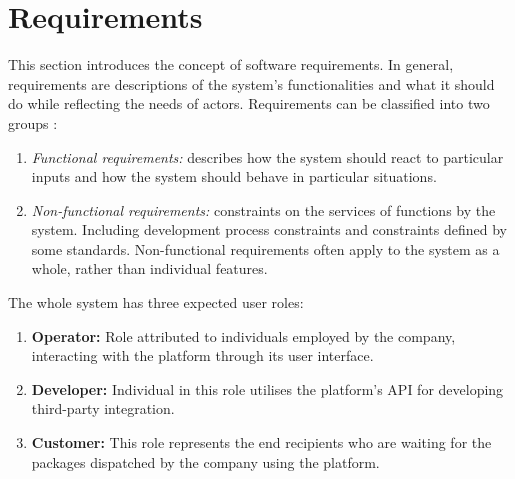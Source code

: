 \section{Requirements}
\label{sec:requirements}
This section introduces the concept of software requirements.
In general, requirements are descriptions of the system's functionalities and what it should do while reflecting the needs of actors.
Requirements can be classified into two groups \cite{sommervilleSW}:
\begin{enumerate}
    \item \textit{Functional requirements:} describes how the system should react to particular inputs and how the system should behave in particular situations.
    \item \textit{Non-functional requirements:} constraints on the services of functions by the system. Including development process constraints and constraints defined by some standards. Non-functional requirements often apply to the system as a whole, rather than individual features.
\end{enumerate}
The whole system has three expected user roles:
\label{sec:requirements-actors}
\begin{enumerate}
    \item \textbf{Operator:} Role attributed to individuals employed by the company, interacting with the platform through its user interface. 
    \item \textbf{Developer:} Individual in this role utilises the platform's API for developing third-party integration.
    \item \textbf{Customer:} This role represents the end recipients who are waiting for the packages dispatched by the company using the platform.
\end{enumerate}

